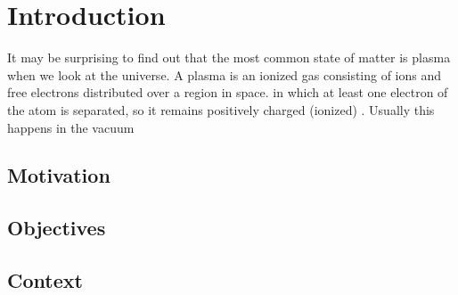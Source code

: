 \chapter{Introduction}
\label{ch:intro}

It may be surprising to find out that the most common state of matter is plasma 
when we look at the universe. A plasma is an ionized gas consisting of ions and
free electrons distributed over a region in space.
in which at least one electron 
of the atom is separated, so it remains positively charged (ionized) 
\cite{chen}.  Usually this happens in the vacuum

\section{Motivation}


\section{Objectives}

\section{Context}

